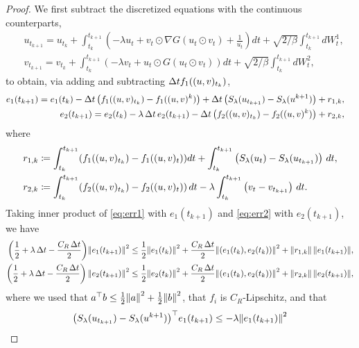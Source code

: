 \documentclass[11pt, twoside]{report}
\begin{document}
\begin{proof}
We first subtract the discretized equations with  the continuous counterparts,
\begin{align*}
&u_{t_{k+1} } = u_{t_k} +  \int_{t_k}^{t_{k+1}}  \left( -\lambda u_t + v_t\odot \nabla G(u_t\odot v_t) + \frac{1}{u_t}\right) dt + \sqrt{2/\beta}\int_{t_k}^{t_{k+1}}  dW^1_t,\\
&v_{t_{k+1} } = v_{t_k} +  \int_{t_k}^{t_{k+1}}  \left( -\lambda v_t + u_t\odot G(u_t \odot v_t) \right) dt + \sqrt{2/\beta}\int_{t_k}^{t_{k+1}} dW^2_t,
\end{align*}
to obtain, via adding and subtracting ${\Delta t} f_1((u,v)_{t_k})$,
\begin{align}
    \begin{split}    
    e_1(t_{k+1}) &= e_1(t_{k}) - \deltat \,\pa{f_1((u,v)_{t_k}) - f_1((u,v)^k)  }+ \deltat \,\pa{S_\lambda(u_{t_{k+1}}) - S_\lambda(u^{k+1})} + r_{1,k},
    \end{split}    \label{eq:err1}\\
    \begin{split}
    e_2(t_{k+1}) &= e_2(t_{k}) - \lambda\,\deltat\, e_2(t_{k+1})  - \deltat \,\pa{f_2((u,v)_{t_k}) - f_2((u,v)^k)  }  + r_{2,k},
   \end{split}\label{eq:err2}
\end{align}
where
\begin{align*}
r_{1,k} &\eqdef  \int_{t_k}^{t_{k+1}}  \pa{ f_1((u,v)_{t_k}) - f_1((u,v)_t) } dt + \int_{t_k}^{t_{k+1}} \left( S_\lambda(u_t) - S_\lambda(u_{t_{k+1}})\right) \,dt,\\
r_{2,k} &\eqdef \int_{t_k}^{t_{k+1}}  \pa{ f_2((u,v)_{t_k}) - f_2((u,v)_t) } \,dt - \lambda \int_{t_k}^{t_{k+1}} \left( v_t - v_{t_{k+1}} \right)\, dt.
\end{align*}
%
Taking inner product of \eqref{eq:err1} with $e_1(t_{k+1})$ and \eqref{eq:err2} with $e_2(t_{k+1})$, we have 
\begin{align*}
    \pa{\frac12 + \lambda \,\deltat - \frac{ C_R\,\tstep}{2}} \norm{e_1(t_{k+1})}^2 &\leq\frac12\norm{e_1(t_{k})}^2+ \frac{ C_R\,\tstep }{2} \norm{(e_1(t_{k}),e_2(t_{k}))}^2   + \norm{r_{1,k}}\,\norm{e_1(t_{k+1})}, \\
   \left(\frac12+\lambda \,\deltat - \frac{C_R\,\tstep}{2} \right) \norm{e_2(t_{k+1})}^2 &\leq \frac12 \norm{e_2(t_{k})}^2+   \frac{C_R\,\tstep }{2} \norm{(e_1(t_{k}),e_2(t_{k}))}^2   + \norm{r_{2,k}}\,\norm{e_2(t_{k+1})},
\end{align*}
where we used that
 ${a^\top}{b}\leq \frac12 \norm{a}^2 + \frac12 \norm{b}^2$, that $f_i$ is $C_R$-Lipschitz, and that  $$\bigl(S_\lambda(u_{t_{k+1}}) - S_\lambda(u^{k+1})\bigr)^\top e_1(t_{k+1}) \leq -\lambda \norm{e_1(t_{k+1})}^2$$

\end{proof}
\end{document}
